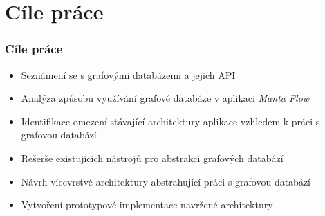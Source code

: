 \documentclass{beamer}
\begin{document}
\section{Cíle práce}
\begin{frame}
\frametitle{Cíle práce}
   \begin{itemize}
      \item Seznámení se s grafovými databázemi a jejich API
      \item Analýza způsobu využívání grafové databáze v aplikaci \textit{Manta Flow}
      \item Identifikace omezení stávající architektury aplikace vzhledem k práci s grafovou databází
      \item Rešerše existujících nástrojů pro abstrakci grafových databází
      \item Návrh vícevrstvé architektury abstrahující práci s grafovou databází
      \item Vytvoření prototypové implementace navržené architektury
   \end{itemize}
\end{frame}
\end{document}
